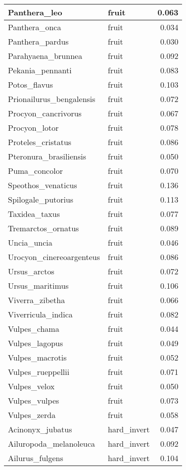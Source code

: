 \begin{table}
\begin{tabular}[t]{l|l|r}
Panthera\_leo & fruit & 0.063\\
\hline
Panthera\_onca & fruit & 0.034\\
\hline
Panthera\_pardus & fruit & 0.030\\
\hline
Parahyaena\_brunnea & fruit & 0.092\\
\hline
Pekania\_pennanti & fruit & 0.083\\
\hline
Potos\_flavus & fruit & 0.103\\
\hline
Prionailurus\_bengalensis & fruit & 0.072\\
\hline
Procyon\_cancrivorus & fruit & 0.067\\
\hline
Procyon\_lotor & fruit & 0.078\\
\hline
Proteles\_cristatus & fruit & 0.086\\
\hline
Pteronura\_brasiliensis & fruit & 0.050\\
\hline
Puma\_concolor & fruit & 0.070\\
\hline
Speothos\_venaticus & fruit & 0.136\\
\hline
Spilogale\_putorius & fruit & 0.113\\
\hline
Taxidea\_taxus & fruit & 0.077\\
\hline
Tremarctos\_ornatus & fruit & 0.089\\
\hline
Uncia\_uncia & fruit & 0.046\\
\hline
Urocyon\_cinereoargenteus & fruit & 0.086\\
\hline
Ursus\_arctos & fruit & 0.072\\
\hline
Ursus\_maritimus & fruit & 0.106\\
\hline
Viverra\_zibetha & fruit & 0.066\\
\hline
Viverricula\_indica & fruit & 0.082\\
\hline
Vulpes\_chama & fruit & 0.044\\
\hline
Vulpes\_lagopus & fruit & 0.049\\
\hline
Vulpes\_macrotis & fruit & 0.052\\
\hline
Vulpes\_rueppellii & fruit & 0.071\\
\hline
Vulpes\_velox & fruit & 0.050\\
\hline
Vulpes\_vulpes & fruit & 0.073\\
\hline
Vulpes\_zerda & fruit & 0.058\\
\hline
Acinonyx\_jubatus & hard\_invert & 0.047\\
\hline
Ailuropoda\_melanoleuca & hard\_invert & 0.092\\
\hline
Ailurus\_fulgens & hard\_invert & 0.104\\

\end{tabular}
\end{table}
